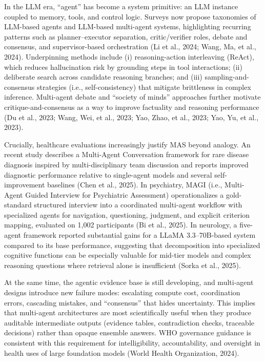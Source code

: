 \documentclass[11pt,a4paper,twoside]{article}
\begin{document}
In the LLM era, ``agent'' has become a system primitive: an LLM instance coupled to memory, tools, and control logic. Surveys now propose taxonomies of LLM-based agents and LLM-based multi-agent systems, highlighting recurring patterns such as planner--executor separation, critic/verifier roles, debate and consensus, and supervisor-based orchestration (Li et al., 2024; Wang, Ma, et al., 2024). Underpinning methods include (i) reasoning-action interleaving (ReAct), which reduces hallucination risk by grounding steps in tool interactions; (ii) deliberate search across candidate reasoning branches; and (iii) sampling-and-consensus strategies (i.e., self-consistency) that mitigate brittleness in complex inference. Multi-agent debate and ``society of minds'' approaches further motivate critique-and-consensus as a way to improve factuality and reasoning performance (Du et al., 2023; Wang, Wei, et al., 2023; Yao, Zhao, et al., 2023; Yao, Yu, et al., 2023).

Crucially, healthcare evaluations increasingly justify MAS beyond analogy. An recent study describes a Multi-Agent Conversation framework for rare disease diagnosis inspired by multi-disciplinary team discussion and reports improved diagnostic performance relative to single-agent models and several self-improvement baselines (Chen et al., 2025). In psychiatry, MAGI (i.e., Multi-Agent Guided Interview for Psychiatric Assessment) operationalizes a gold-standard structured interview into a coordinated multi-agent workflow with specialized agents for navigation, questioning, judgment, and explicit criterion mapping, evaluated on 1,002 participants (Bi et al., 2025). In neurology, a five-agent framework reported substantial gains for a LLaMA 3.3--70B-based system compared to its base performance, suggesting that decomposition into specialized cognitive functions can be especially valuable for mid-tier models and complex reasoning questions where retrieval alone is insufficient (Sorka et al., 2025).

At the same time, the agentic evidence base is still developing, and multi-agent designs introduce new failure modes: escalating compute cost, coordination errors, cascading mistakes, and ``consensus'' that hides uncertainty. This implies that multi-agent architectures are most scientifically useful when they produce auditable intermediate outputs (evidence tables, contradiction checks, traceable decisions) rather than opaque ensemble answers. WHO governance guidance is consistent with this requirement for intelligibility, accountability, and oversight in health uses of large foundation models (World Health Organization, 2024).
\end{document}
